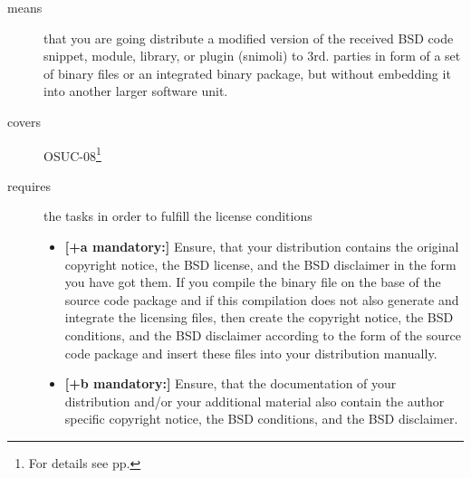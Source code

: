 \begin{description}
\item[means] that you are going distribute a modified version of the received
BSD code snippet, module, library, or plugin (snimoli) to 3rd. parties in form
of a set of binary files or an integrated binary package, but without embedding
it into another larger software unit.
\item[covers] OSUC-08\footnote{For details see pp. \pageref{OSUC-08-DEF}}
\item[requires] the tasks in order to fulfill the license conditions
\begin{itemize}
   \item  \textbf{[+a mandatory:]} Ensure, that your distribution contains the
  original copyright notice, the BSD license, and the BSD disclaimer in the form
  you have got them. If you compile the binary file on the base of the source
  code package and if this compilation does not also generate and integrate the
  licensing files, then create the copyright notice, the BSD conditions, and the
  BSD disclaimer according to the form of the source code package and insert
  these files into your distribution manually.
  \item  \textbf{[+b mandatory:]} Ensure, that the documentation of your
  distribution and/or your additional material also contain the author specific
  copyright notice, the BSD conditions, and the BSD disclaimer.
\end{itemize}
\end{description}

